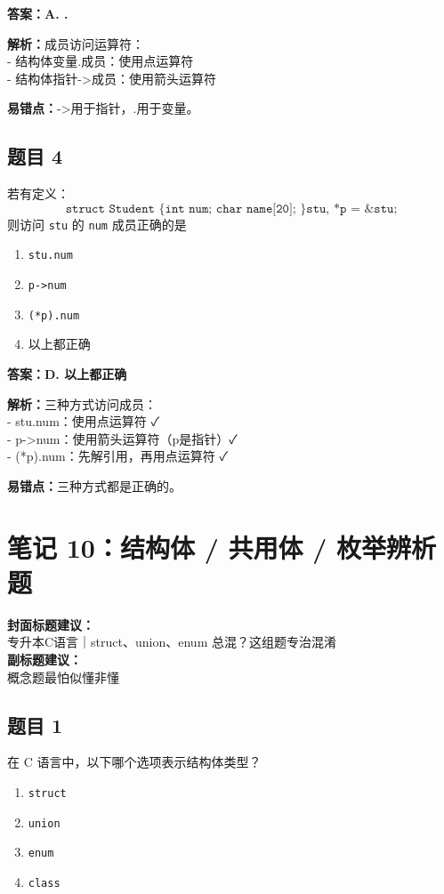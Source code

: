 \documentclass[12pt,a4paper]{ctexart}
\begin{document}
\begin{answerbox}
	\textbf{答案：A. .}

	\textbf{解析：}成员访问运算符：\\
	- 结构体变量.成员：使用点运算符\\
	- 结构体指针->成员：使用箭头运算符

	\textbf{易错点：}->用于指针，.用于变量。
\end{answerbox}

\subsection*{题目 4}
若有定义：
\[
	\texttt{struct Student \{ int num; char name[20]; \} stu, *p = \&stu;}
\]
则访问 \texttt{stu} 的 \texttt{num} 成员正确的是
\begin{enumerate}[label=\Alph*.]
	\item \texttt{stu.num}
	\item \texttt{p->num}
	\item \texttt{(*p).num}
	\item 以上都正确
\end{enumerate}

\begin{answerbox}
	\textbf{答案：D. 以上都正确}

	\textbf{解析：}三种方式访问成员：\\
	- stu.num：使用点运算符 ✓\\
	- p->num：使用箭头运算符（p是指针）✓\\
	- (*p).num：先解引用，再用点运算符 ✓

	\textbf{易错点：}三种方式都是正确的。
\end{answerbox}

\newpage

\section{笔记 10：结构体 / 共用体 / 枚举辨析题}
\begin{coverbox}
	\textbf{封面标题建议：}\\
	专升本C语言｜struct、union、enum 总混？这组题专治混淆\\
	\textbf{副标题建议：}\\
	概念题最怕似懂非懂
\end{coverbox}

\subsection*{题目 1}
在 C 语言中，以下哪个选项表示结构体类型？
\begin{enumerate}[label=\Alph*.]
	\item \texttt{struct}
	\item \texttt{union}
	\item \texttt{enum}
	\item \texttt{class}
\end{enumerate}
\end{document}
